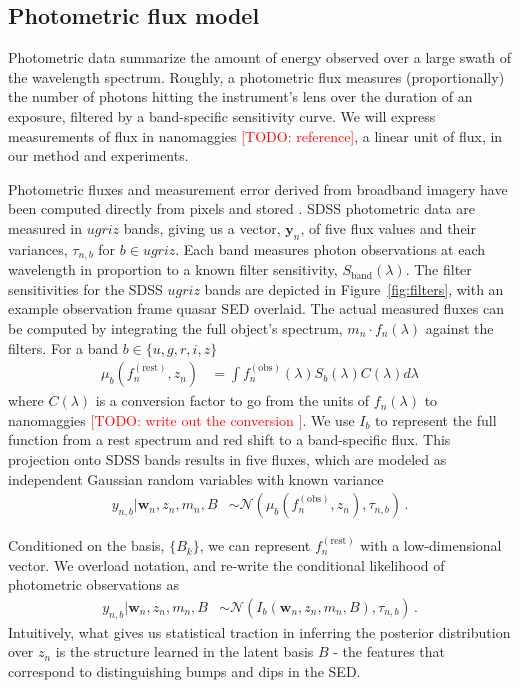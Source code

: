 \documentclass{article}
\newcommand{\red}[1]{\textcolor{red}{[TODO: #1]}}
\begin{document}
\subsection{Photometric flux model }
Photometric data summarize the amount of energy observed over a large swath of the wavelength spectrum.  Roughly, a photometric flux measures (proportionally) the number of photons hitting the instrument's lens over the duration of an exposure, filtered by a band-specific sensitivity curve. 
We will express measurements of flux in nanomaggies \red{reference}, a linear unit of flux, in our method and experiments.  

Photometric fluxes and measurement error derived from broadband imagery have been computed directly from pixels and stored \cite{luptonsdss}.  
SDSS photometric data are measured in $ugriz$ bands, giving us a vector, $\mathbf{y}_n$, of five flux values and their variances, $\tau_{n, b}$ for $b \in ugriz$. 
Each band measures photon observations at each wavelength in proportion to a known filter sensitivity, $S_{\text{band}}(\lambda)$. 
The filter sensitivities for the SDSS $ugriz$ bands are depicted in Figure~\ref{fig:filters}, with an example observation frame quasar SED overlaid.  The actual measured fluxes can be computed by integrating the full object's spectrum, $m_n \cdot f_n(\lambda)$ against the filters.  For a band $b \in \{u, g, r, i, z \}$
\begin{align}
  \mu_b(f_n^{(\text{rest})}, z_n) &= \int f^{(\text{obs})}_n(\lambda) S_b(\lambda) C(\lambda) d \lambda 
\end{align}
where $C(\lambda)$ is a conversion factor to go from the units of $f_n(\lambda)$ to nanomaggies \red{ write out the conversion }. We use $I_b$ to represent the full function from 
a rest spectrum and red shift to a band-specific flux. This projection onto SDSS bands results in five fluxes, which are modeled as independent Gaussian random variables with known variance
\begin{align}
  y_{n,b} | \mathbf{w}_n, z_n, m_n, B &\sim \mathcal{N}( \mu_b(f_n^{(\text{obs})}, z_n), \tau_{n,b} ) \, .
\end{align}

Conditioned on the basis, $\{B_k\}$, we can represent $f_n^{(\text{rest})}$ with a low-dimensional vector.  We overload notation, and re-write the conditional likelihood of photometric observations as
\begin{align}
    y_{n,b} | \mathbf{w}_n, z_n, m_n, B &\sim \mathcal{N}( I_b(\mathbf{w}_n, z_n, m_n, B), \tau_{n,b} ) \, .
   \label{eq:phot}
\end{align}
Intuitively, what gives us statistical traction in inferring the posterior distribution over $z_n$ is the structure learned in the latent basis $B$ - the features that correspond to distinguishing bumps and dips in the SED.  
\end{document}
